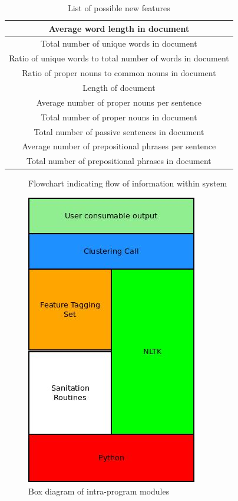 \documentclass[]{article}
\begin{document}
\begin{table}
	\begin{center}
		\begin{tabular}{| c |} \hline
			Average word length in document \\ \hline
			Total number of unique words in document\\ \hline
			Ratio of unique words to total number of words in document \\ \hline
			Ratio of proper nouns to common nouns in document \\ \hline
			Length of document \\ \hline
			Average number of proper nouns per sentence \\ \hline
			Total number of proper nouns in document \\ \hline
			Total number of passive sentences in document \\ \hline
			Average number of prepositional phrases per sentence \\ \hline
			Total number of prepositional phrases in document \\ \hline
			
		\end{tabular}
	\end{center}
\caption{List of possible new features}
\label{table:features2}
\end{table}


\begin{figure}
	\label{flowchart}
	\caption{Flowchart indicating flow of information within system}
	\centering
\end{figure}

\begin{figure}
	\label{boxchart}
	\caption{Box diagram of intra-program modules}
	\centering
	\includegraphics{../StackDiagram.jpg}
\end{figure}

\printbibliography
\end{document}
